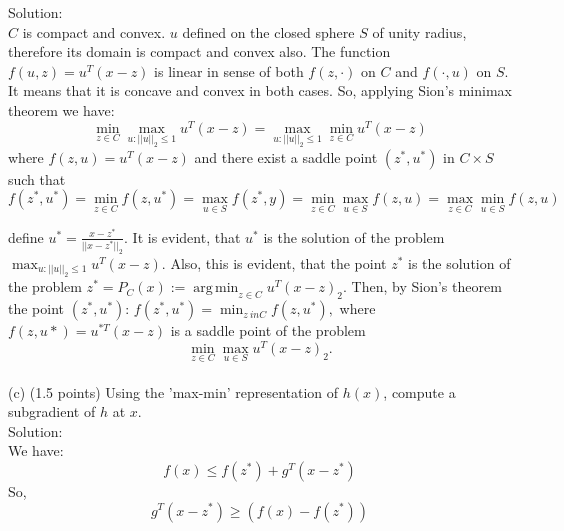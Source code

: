\documentclass{article}
\begin{document}
Solution: \\
$C$ is compact and convex. $u$ defined on the closed sphere $S$ of unity radius, therefore its domain is compact and convex also. The function $f(u, z) = u^T(x - z)$ is linear 
in sense of both $f(z, \cdot)$ on $C$ and $f(\cdot, u)$ 
on $S.$ It means that it is concave and convex in both cases. So, applying Sion's minimax theorem  we have:\\
$$
\min_{z \in C} \max_{u:||u||_2 \leq 1} u^T(x - z) = 
\max_{u:||u||_2 \leq 1} \min_{z \in C} u^T(x - z)
$$
where ${f(z, u) = u^T(x - z)}$
and there exist a saddle point $(z^*, u^*)$ in $C \times S$
such that 
$$
f(z^*, u^*) = \min_{z \in C} f(z, u^*) = 
\max_{u \in S} f(z^*, y) = \min_{z \in C} \max_{u \in S} f(z, u) = \max_{z \in C} \min_{u \in S}  f(z, u)
$$

define $u^* = \frac{x - z^*}{||x - z^*||_2}.$ It is evident, that $u^*$ is the solution of the problem 
$\max_{u:||u||_2 \leq 1} u^T(x - z).$ Also, this is evident, that the point $z^*$ is the solution of the problem 
${z^* = P_C(x) := \operatorname*{arg\,min}_{z \in C}
	u^T(x - z)_2}.$ 
Then, by Sion's theorem the point 
${(z^*, u^*): \, f(z^*, u^*)} = \min_{z \ in C} f(z, u^*),$
where ${f(z, u*) = u^{*T}(x - z)}$
is a saddle point of the problem 
$$
\min_{z \in C} \max_{u \in S} u^T(x - z)_2.
$$
\\
(c) (1.5 points) Using the 'max-min' representation of $h(x)$, compute a subgradient of $h$ at $x$. \\

Solution: \\

We have:\\
$$
f(x) \leq f(z^*) + g^T (x - z^*)
$$
So, 
$$
g^T (x - z^*) \geq (f(x) - f(z^*))
$$
\end{document}
